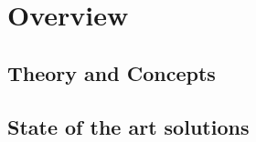 



\section{Overview}

\subsection{Theory and Concepts}

 
\label{theory} 


\label{models-bp} 

\subsection{State of the art solutions}
\label{overview-models}  



\label{models-recirc} 



\label{models-chl} 



\label{models-generec} 

 
\label{models-bal} 
